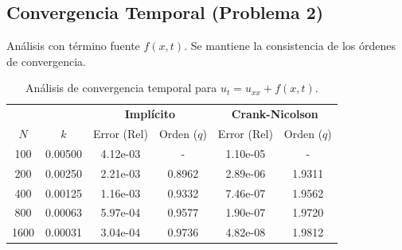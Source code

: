 \documentclass{article}
\begin{document}
\hypertarget{tablas_implicito_p2}{\subsection{Convergencia Temporal (Problema 2)}
}
Análisis con término fuente $f(x,t)$. Se mantiene la consistencia de los órdenes de convergencia.
\begin{table}[h!]
	\centering
	\begin{tabular}{|cc|cc|cc|}
		\toprule
		     &         & \multicolumn{2}{c|}{\textbf{Implícito}} & \multicolumn{2}{c}{\textbf{Crank-Nicolson}}                             \\
		$N$  & $k$     & Error (Rel)                             & Orden ($q$)                                 & Error (Rel) & Orden ($q$) \\
		\midrule
		100  & 0.00500 & 4.12e-03                                & -                                           & 1.10e-05    & -           \\
		200  & 0.00250 & 2.21e-03                                & 0.8962                                      & 2.89e-06    & 1.9311      \\
		400  & 0.00125 & 1.16e-03                                & 0.9332                                      & 7.46e-07    & 1.9562      \\
		800  & 0.00063 & 5.97e-04                                & 0.9577                                      & 1.90e-07    & 1.9720      \\
		1600 & 0.00031 & 3.04e-04                                & 0.9736                                      & 4.82e-08    & 1.9812      \\
		\bottomrule
	\end{tabular}
	\caption{Análisis de convergencia temporal para $u_t = u_{xx} + f(x,t)$.}
	\label{tab:p2_temporal}
\end{table}
\end{document}
